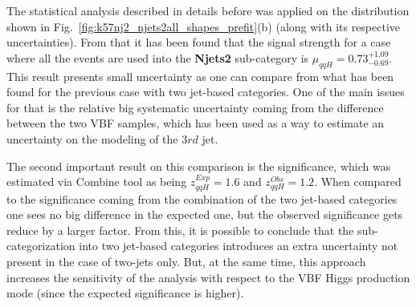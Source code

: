 The statistical analysis described in details before was applied on the distribution shown in Fig.~\ref{fig:k57nj2_njets2all_shapes_prefit}(b) (along with its respective uncertainties). From that it has been found that the signal strength for a case where all the events are used into the \textbf{Njets2} sub-category is $\mu_{qqH} = 0.73_{-0.69}^{+1.09}$. This result presents small uncertainty as one can compare from what has been found for the previous case with two jet-based categories. One of the main issues for that is the relative big systematic uncertainty coming from the difference between the two VBF samples, which has been used as a way to estimate an uncertainty on the modeling of the 3$rd$ jet.

The second important result on this comparison is the significance, which was estimated via Combine tool as being $z_{qqH}^{Exp} = 1.6$ and $z_{qqH}^{Obs} = 1.2$. When compared to the significance coming from the combination of the two jet-based categories one sees no big difference in the expected one, but the observed significance gets reduce by a larger factor. From this, it is possible to conclude that the sub-categorization into two jet-based categories introduces an extra uncertainty not present in the case of two-jets only. But, at the same time, this approach increases the sensitivity of the analysis with respect to the VBF Higgs production mode (since the expected significance is higher).